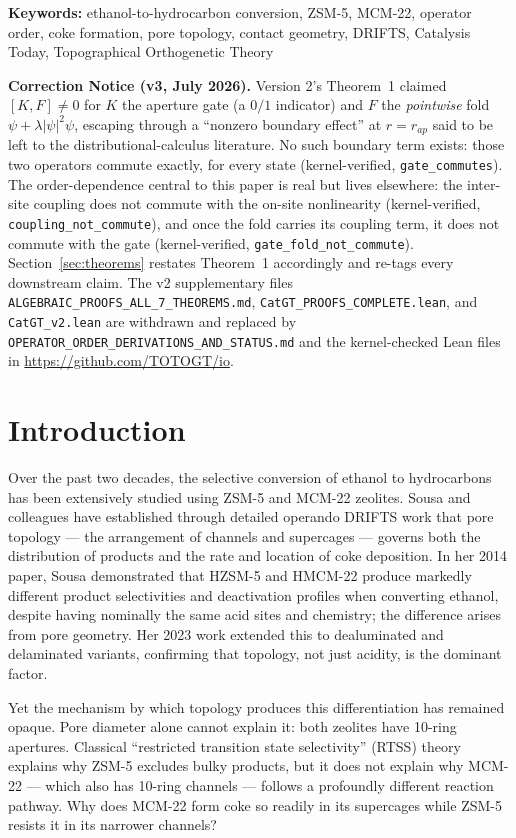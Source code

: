 \documentclass[11pt]{article}
\begin{document}
\noindent\textbf{Keywords:} ethanol-to-hydrocarbon conversion, ZSM-5, MCM-22, operator order, coke formation, pore topology, contact geometry, DRIFTS, Catalysis Today, Topographical Orthogenetic Theory

\bigskip
\noindent\textbf{Correction Notice (v3, July 2026).} Version 2's Theorem~1 claimed $[K,F]\neq 0$ for $K$ the aperture gate (a $0/1$ indicator) and $F$ the \emph{pointwise} fold $\psi + \lambda|\psi|^2\psi$, escaping through a ``nonzero boundary effect'' at $r=r_{ap}$ said to be left to the distributional-calculus literature. No such boundary term exists: those two operators commute exactly, for every state (kernel-verified, \texttt{gate\_commutes}). The order-dependence central to this paper is real but lives elsewhere: the inter-site coupling does not commute with the on-site nonlinearity (kernel-verified, \texttt{coupling\_not\_commute}), and once the fold carries its coupling term, it does not commute with the gate (kernel-verified, \texttt{gate\_fold\_not\_commute}). Section~\ref{sec:theorems} restates Theorem~1 accordingly and re-tags every downstream claim. The v2 supplementary files \texttt{ALGEBRAIC\_PROOFS\_ALL\_7\_THEOREMS.md}, \texttt{CatGT\_PROOFS\_COMPLETE.lean}, and \texttt{CatGT\_v2.lean} are withdrawn and replaced by \texttt{OPERATOR\_ORDER\_DERIVATIONS\_AND\_STATUS.md} and the kernel-checked Lean files in \url{https://github.com/TOTOGT/io}.

\section{Introduction}

Over the past two decades, the selective conversion of ethanol to hydrocarbons has been extensively studied using ZSM-5 and MCM-22 zeolites. Sousa and colleagues have established through detailed operando DRIFTS work \cite{sousa2014,sousa2023} that pore topology --- the arrangement of channels and supercages --- governs both the distribution of products and the rate and location of coke deposition. In her 2014 paper, Sousa demonstrated that HZSM-5 and HMCM-22 produce markedly different product selectivities and deactivation profiles when converting ethanol, despite having nominally the same acid sites and chemistry; the difference arises from pore geometry. Her 2023 work extended this to dealuminated and delaminated variants, confirming that topology, not just acidity, is the dominant factor.

Yet the mechanism by which topology produces this differentiation has remained opaque. Pore diameter alone cannot explain it: both zeolites have 10-ring apertures. Classical ``restricted transition state selectivity'' (RTSS) theory \cite{weisz1960,csicsery1984} explains why ZSM-5 excludes bulky products, but it does not explain why MCM-22 --- which also has 10-ring channels --- follows a profoundly different reaction pathway. Why does MCM-22 form coke so readily in its supercages while ZSM-5 resists it in its narrower channels?
\end{document}
